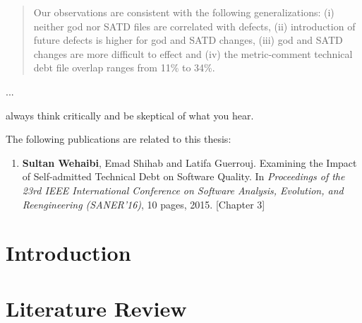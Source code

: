 \documentclass[12pt]{report}
\begin{document}
\begin{abstract}
Our observations are consistent with the following generalizations: (i) neither god nor SATD files are correlated with defects, (ii) introduction of future defects is higher for god and SATD changes, (iii) god and SATD changes are more difficult to effect and (iv) the metric-comment technical debt file overlap ranges from 11\% to 34\%.


\end{abstract}



\begin{acknowledgments}

...

\end{acknowledgments}




\begin{dedication}
	\begin{flushright}
	always think critically and be skeptical of what you hear.\\
	\end{flushright}
\end{dedication}

\begin{publications}

The following publications are related to this thesis:

\begin{enumerate}

\item \textbf{Sultan Wehaibi}, Emad Shihab and Latifa Guerrouj. Examining the Impact of Self-admitted Technical Debt on Software Quality. In \textit{Proceedings of the 23rd IEEE International Conference on Software Analysis, Evolution, and Reengineering (SANER’16)}, 10 pages, 2015. [Chapter 3]


\end{enumerate}

\end{publications}

\chapter{Introduction}
\label{introduction}


\chapter{Literature Review}
\label{literature_review}

\end{document}

